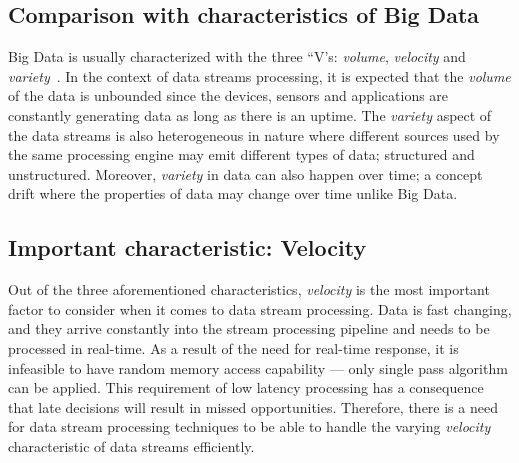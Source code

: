 \subsection{Comparison with characteristics of Big Data}
Big Data is usually characterized with the three “V's: \emph{volume}, \emph{velocity} 
and \emph{variety}~\cite{big_data_analytics}. 
In the context of data streams processing, it is expected that the \emph{volume} of 
the data is unbounded since the devices, sensors and applications are constantly 
generating data as long as there is an uptime. The \emph{variety} aspect of the 
data streams is also heterogeneous in nature where different sources used by the same 
processing engine may emit different types of data; structured and unstructured. 
Moreover, \emph{variety} in data can also happen over time; a concept drift where 
the properties of data may change over time unlike Big Data. 

\subsection{Important characteristic: Velocity}
Out of the three aforementioned characteristics, \emph{velocity} is the most important 
factor to consider when it comes to data stream processing. Data is fast 
changing, and they arrive constantly into the stream processing pipeline and needs to 
be processed in real-time. As a result of the need for real-time response, it is 
infeasible to have random memory access capability --- only single pass algorithm can
be applied. This requirement of low latency processing has a consequence 
that late decisions will result in missed opportunities. Therefore, there is a need 
for data stream processing techniques to be able to handle the varying \emph{velocity}
characteristic of data streams efficiently. 
